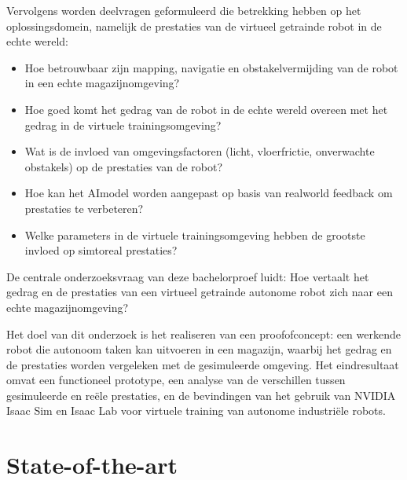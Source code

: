 Vervolgens worden deelvragen geformuleerd die betrekking hebben op het oplossingsdomein, namelijk de prestaties van de virtueel getrainde robot in de echte wereld:

\begin{itemize}
    \item Hoe betrouwbaar zijn mapping, navigatie en obstakelvermijding van de robot in een echte magazijnomgeving?
    \item Hoe goed komt het gedrag van de robot in de echte wereld overeen met het gedrag in de virtuele trainingsomgeving?
    \item Wat is de invloed van omgevingsfactoren (licht, vloerfrictie, onverwachte obstakels) op de prestaties van de robot?
    \item Hoe kan het AI\-model worden aangepast op basis van real\-world feedback om prestaties te verbeteren?
    \item Welke parameters in de virtuele trainingsomgeving hebben de grootste invloed op sim\-to\-real prestaties?
\end{itemize}

De centrale onderzoeksvraag van deze bachelorproef luidt:
Hoe vertaalt het gedrag en de prestaties van een virtueel getrainde autonome robot zich naar een echte magazijnomgeving?

Het doel van dit onderzoek is het realiseren van een proof\-of\-concept: een werkende robot die autonoom taken kan uitvoeren in een magazijn, waarbij het gedrag en de prestaties worden vergeleken met de gesimuleerde omgeving. Het eindresultaat omvat een functioneel prototype, een analyse van de verschillen tussen gesimuleerde en reële prestaties, en de bevindingen van het gebruik van NVIDIA Isaac Sim en Isaac Lab voor virtuele training van autonome industriële robots.

\section{State-of-the-art}%
\label{sec:State-of-the-art}

